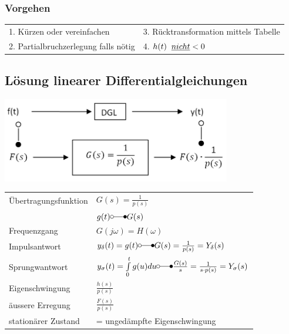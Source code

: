 		\subsubsection{Vorgehen}
			\begin{tabular}{p{6cm}p{6cm}}
				1. Kürzen oder vereinfachen &
				3. Rücktransformation mittels Tabelle \\
				2. Partialbruchzerlegung falls nötig &
				4. $h(t)\hspace{0.2cm}\underline{nicht} < 0$ \\
			\end{tabular}
	
	\subsection{Lösung linearer Differentialgleichungen}

		\includegraphics[width=10cm]{./bilder/diffgleichungen.png} \\
		\renewcommand{\arraystretch}{2}
		\begin{tabular}{| l | l |}
			\hline
				Übertragungsfunktion & $G(s) = \frac{1}{p(s)}$\\
				& $g(t) \laplace G(s)$ \\
			\hline
				Frequenzgang & $G(j\omega) = H(\omega)$ \\
			\hline
				Impulsantwort & $y_{\delta}(t) = g(t) \laplace G(s) = \frac{1}{p(s)}=Y_{\delta}(s)$\\
			\hline
				Sprungwantwort & $y_{\sigma}(t)=\int\limits_0^t g(u) du \laplace \frac{G(s)}{s} = \frac{1}{s \cdot p(s)} = Y_{\sigma}(s)$\\
			\hline
				Eigenschwingung & $\frac{h(s)}{p(s)}$ \\
			\hline
				äussere Erregung & $\frac{F(s)}{p(s)}$ \\
			\hline
				stationärer Zustand & = ungedämpfte Eigenschwingung\\
			\hline
		\end{tabular}
		\renewcommand{\arraystretch}{\arraystretchOriginal}\\
		
